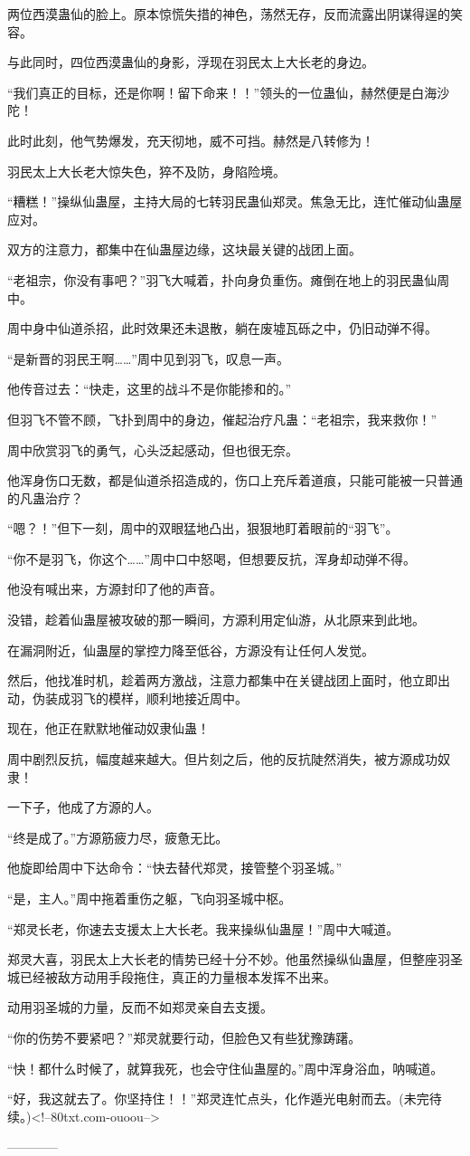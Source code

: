 \begin{this_body}
两位西漠蛊仙的脸上。原本惊慌失措的神色，荡然无存，反而流露出阴谋得逞的笑容。

与此同时，四位西漠蛊仙的身影，浮现在羽民太上大长老的身边。

“我们真正的目标，还是你啊！留下命来！！”领头的一位蛊仙，赫然便是白海沙陀！

此时此刻，他气势爆发，充天彻地，威不可挡。赫然是八转修为！

羽民太上大长老大惊失色，猝不及防，身陷险境。

“糟糕！”操纵仙蛊屋，主持大局的七转羽民蛊仙郑灵。焦急无比，连忙催动仙蛊屋应对。

双方的注意力，都集中在仙蛊屋边缘，这块最关键的战团上面。

“老祖宗，你没有事吧？”羽飞大喊着，扑向身负重伤。瘫倒在地上的羽民蛊仙周中。

周中身中仙道杀招，此时效果还未退散，躺在废墟瓦砾之中，仍旧动弹不得。

“是新晋的羽民王啊……”周中见到羽飞，叹息一声。

他传音过去：“快走，这里的战斗不是你能掺和的。”

但羽飞不管不顾，飞扑到周中的身边，催起治疗凡蛊：“老祖宗，我来救你！”

周中欣赏羽飞的勇气，心头泛起感动，但也很无奈。

他浑身伤口无数，都是仙道杀招造成的，伤口上充斥着道痕，只能可能被一只普通的凡蛊治疗？

“嗯？！”但下一刻，周中的双眼猛地凸出，狠狠地盯着眼前的“羽飞”。

“你不是羽飞，你这个……”周中口中怒喝，但想要反抗，浑身却动弹不得。

他没有喊出来，方源封印了他的声音。

没错，趁着仙蛊屋被攻破的那一瞬间，方源利用定仙游，从北原来到此地。

在漏洞附近，仙蛊屋的掌控力降至低谷，方源没有让任何人发觉。

然后，他找准时机，趁着两方激战，注意力都集中在关键战团上面时，他立即出动，伪装成羽飞的模样，顺利地接近周中。

现在，他正在默默地催动奴隶仙蛊！

周中剧烈反抗，幅度越来越大。但片刻之后，他的反抗陡然消失，被方源成功奴隶！

一下子，他成了方源的人。

“终是成了。”方源筋疲力尽，疲惫无比。

他旋即给周中下达命令：“快去替代郑灵，接管整个羽圣城。”

“是，主人。”周中拖着重伤之躯，飞向羽圣城中枢。

“郑灵长老，你速去支援太上大长老。我来操纵仙蛊屋！”周中大喊道。

郑灵大喜，羽民太上大长老的情势已经十分不妙。他虽然操纵仙蛊屋，但整座羽圣城已经被敌方动用手段拖住，真正的力量根本发挥不出来。

动用羽圣城的力量，反而不如郑灵亲自去支援。

“你的伤势不要紧吧？”郑灵就要行动，但脸色又有些犹豫踌躇。

“快！都什么时候了，就算我死，也会守住仙蛊屋的。”周中浑身浴血，呐喊道。

“好，我这就去了。你坚持住！！”郑灵连忙点头，化作遁光电射而去。(未完待续。)<!--80txt.com-ouoou-->

------------

\end{this_body}

